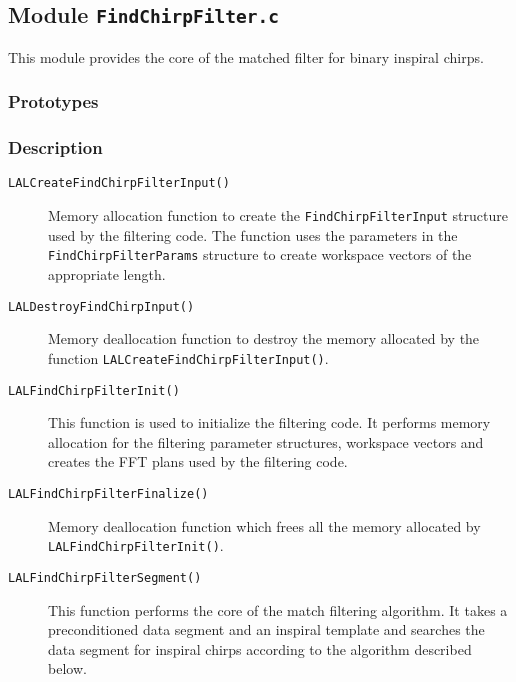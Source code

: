 \subsection{Module \texttt{FindChirpFilter.c}}
\label{ss:FindChirpFilter.c}

This module provides the core of the matched filter for binary inspiral
chirps.

\subsubsection*{Prototypes}
\vspace{0.1in}


\subsubsection*{Description}

\begin{description}
\item[\texttt{LALCreateFindChirpFilterInput()}] Memory allocation function to
create the \texttt{FindChirpFilterInput} structure used by the filtering code.
The function uses the parameters in the \texttt{FindChirpFilterParams}
structure to create workspace vectors of the appropriate length.

\item[\texttt{LALDestroyFindChirpInput()}] Memory deallocation function to
destroy the memory allocated by the function
\texttt{LALCreateFindChirpFilterInput()}.

\item[\texttt{LALFindChirpFilterInit()}] This function is used to initialize
the filtering code. It performs memory allocation for the filtering parameter
structures, workspace vectors and creates the FFT plans used by the filtering
code.

\item[\texttt{LALFindChirpFilterFinalize()}] Memory deallocation function
which frees all the memory allocated by \texttt{LALFindChirpFilterInit()}.

\item[\texttt{LALFindChirpFilterSegment()}] This function performs the core of
the match filtering algorithm. It takes a preconditioned data segment and an
inspiral template and searches the data segment for inspiral chirps according
to the algorithm described below.

\end{description}


